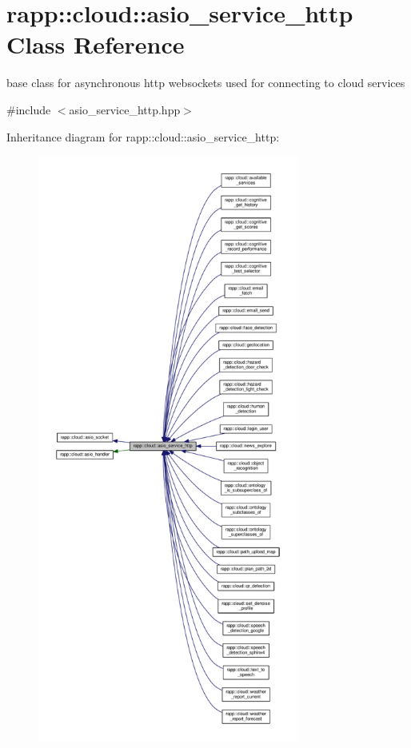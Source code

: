 \hypertarget{classrapp_1_1cloud_1_1asio__service__http}{\section{rapp\-:\-:cloud\-:\-:asio\-\_\-service\-\_\-http Class Reference}
\label{classrapp_1_1cloud_1_1asio__service__http}
}


base class for asynchronous http websockets used for connecting to cloud services  




{\ttfamily \#include $<$asio\-\_\-service\-\_\-http.\-hpp$>$}



Inheritance diagram for rapp\-:\-:cloud\-:\-:asio\-\_\-service\-\_\-http\-:
\nopagebreak
\begin{figure}[H]
\begin{center}
\leavevmode
\includegraphics[height=550pt]{classrapp_1_1cloud_1_1asio__service__http__inherit__graph}
\end{center}
\end{figure}


